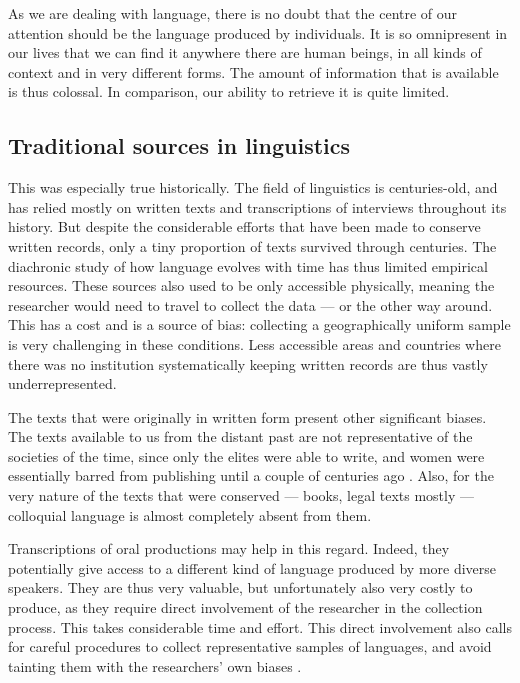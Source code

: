 \documentclass[../thesis.tex]{subfiles}
\begin{document}
As we are dealing with language, there is no doubt that the centre of our attention
should be the language produced by individuals. It is so omnipresent in our lives that
we can find it anywhere there are human beings, in all kinds of context and in very
different forms. The amount of information that is available is thus colossal. In
comparison, our ability to retrieve it is quite limited.


\subsection{Traditional sources in linguistics}
\label{sec:method_trad_data}
This was especially true historically. The field of linguistics is centuries-old, and
has relied mostly on written texts and transcriptions of interviews throughout its
history. But despite the considerable efforts that have been made to conserve written records, only a tiny proportion of texts survived through
centuries. The diachronic study of how language evolves with time has thus limited
empirical resources. These sources also used to be only accessible physically, meaning
the researcher would need to travel to collect the data --- or the other way around.
This has a cost and is a source of bias: collecting a geographically uniform
sample is very challenging in these conditions. Less accessible areas and countries
where there was no institution systematically keeping written records are thus vastly
underrepresented.

The texts that were originally in written form present other significant biases. The
texts available to us from the distant past are not representative of the societies of
the time, since only the elites were able to write, and women were essentially barred
from publishing until a couple of centuries ago \cite{SmitterbergEnglishGenres2015}.
Also, for the very nature of the texts that were conserved --- books, legal texts mostly \cite{RissanenHelsinkiCorpus1993,HuSheffieldCorpus2005,DaviesExpandingHorizons2012}
--- colloquial language is almost completely absent from them.

Transcriptions of oral productions may help in this regard. Indeed, they potentially
give access to a different kind of language produced by more diverse speakers. They are
thus very valuable, but unfortunately also very costly to produce, as they require
direct involvement of the researcher in the collection process. This takes considerable
time and effort. This direct involvement also calls for careful procedures to collect
representative samples of languages, and avoid tainting them with the researchers' own
biases \cite{PickfordAmericanLinguistic1956,AlshenqeetiInterviewingData2014}. 
\end{document}
